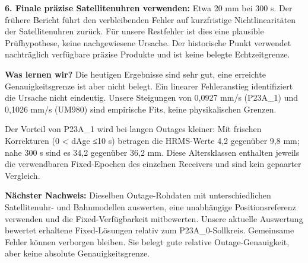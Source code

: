 \documentclass[11pt,a4paper]{article}
\numberwithin{equation}{section}
\numberwithin{figure}{section}
\begin{document}
\textbf{6. Finale präzise Satellitenuhren verwenden:} Etwa 20 mm bei 300 s. Der frühere Bericht führt den verbleibenden Fehler auf kurzfristige Nichtlinearitäten der Satellitenuhren zurück. Für unsere Restfehler ist dies eine plausible Prüfhypothese, keine nachgewiesene Ursache. Der historische Punkt verwendet nachträglich verfügbare präzise Produkte und ist keine belegte Echtzeitgrenze.

\textbf{Was lernen wir?} Die heutigen Ergebnisse sind sehr gut, eine erreichte Genauigkeitsgrenze ist aber nicht belegt. Ein linearer Fehleranstieg identifiziert die Ursache nicht eindeutig. Unsere Steigungen von 0,0927 mm/\allowbreak{}s (P23A\_1) und 0,1026 mm/\allowbreak{}s (UM980) sind empirische Fits, keine physikalischen Grenzen.

Der Vorteil von P23A\_1 wird bei langen Outages kleiner: Mit frischen Korrekturen (0 < dAge ≤10 s) betragen die HRMS-Werte 4,2 gegenüber 9,8 mm; nahe 300 s sind es 34,2 gegenüber 36,2 mm. Diese Altersklassen enthalten jeweils die verwendbaren Fixed-Epochen des einzelnen Receivers und sind kein gepaarter Vergleich.

\textbf{Nächster Nachweis:} Dieselben Outage-Rohdaten mit unterschiedlichen Satellitenuhr- und Bahnmodellen auswerten, eine unabhängige Positionsreferenz verwenden und die Fixed-Verfügbarkeit mitbewerten. Unsere aktuelle Auswertung bewertet erhaltene Fixed-Lösungen relativ zum P23A\_0-Sollkreis. Gemeinsame Fehler können verborgen bleiben. Sie belegt gute relative Outage-Genauigkeit, aber keine absolute Genauigkeitsgrenze.
\end{document}
